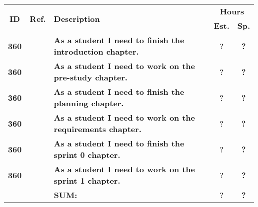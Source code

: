 \label{tab:sprint2Documentationstories}
\def\arraystretch{1.25}
 
\begin{longtable}{ccXcc}

\toprule[0.5mm]
\multirow{2}{*}{\textbf{ID}} &
\multirow{2}{*}{\textbf{Ref.}} & \multirow{2}{*}{\textbf{Description}} & \multicolumn{2}{c}{\textbf{Hours}} \\
 					& & & \textbf{Est.} & \textbf{Sp.} \\
\midrule




\textbf{360} 	& {}
	& {\bf As a student I need to finish the introduction chapter.} 								& 	?	& \textbf{ ?} \\

\textbf{360} 	& {}
	& {\bf As a student I need to work on the pre-study chapter.} 									& 	?	& \textbf{ ?} \\

\textbf{360} 	& {}
	& {\bf As a student I need to finish the planning chapter.} 									& 	?	& \textbf{ ?} \\

\textbf{360} 	& {}
	& {\bf As a student I need to work on the requirements chapter.} 								& 	?	& \textbf{ ?} \\

\textbf{360} 	& {}
	& {\bf As a student I need to finish the sprint 0 chapter.} 									& 	?	& \textbf{ ?} \\

\textbf{360} 	& {}
	& {\bf As a student I need to work on the sprint 1 chapter.} 									& 	?	& \textbf{ ?} \\

								
\hline
				&& \textbf{SUM:}		&		?	& \textbf{?}
 \\																			
\bottomrule[0.5mm]
\end{longtable}

